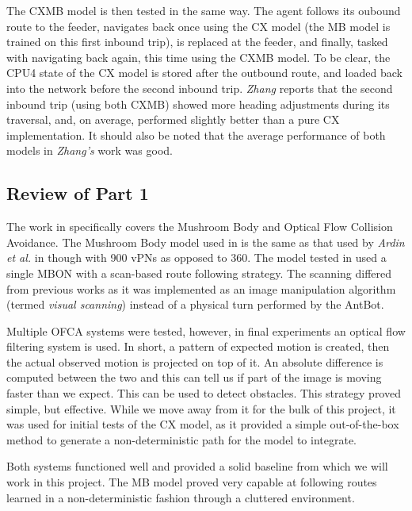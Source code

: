 \documentclass[a4paper,11pt,twoside,openright]{article}
\begin{document}
The CXMB model is then tested in the same way. The agent follows its oubound
route to the feeder, navigates back once using the CX model (the MB model is
trained on this first inbound trip), is replaced at the
feeder, and finally, tasked with navigating back again, this time using the CXMB
model. To be clear, the CPU4 state of the CX model is stored after the outbound
route, and loaded back into the network before the second inbound trip.
\textit{Zhang} reports that the second inbound trip (using both CXMB) showed
more heading adjustments during its traversal, and, on average, performed
slightly better than a pure CX implementation\cite{Zhang2017}. It should also
be noted that the average performance of both models in \textit{Zhang's} work
was good\cite{Zhang2017}.

\subsection{ Review of Part 1 }
The work in \cite{Mitchell2018} specifically covers the Mushroom Body
and Optical Flow Collision Avoidance. The Mushroom Body model used in
\cite{Mitchell2018} is the same as that used by \textit{Ardin et al.} in
\cite{Ardin2016} though with 900 vPNs as opposed to 360. The model tested
in \cite{Mitchell2018} used a single MBON with a scan-based route following
strategy. The scanning differed from previous works as it was implemented
as an image manipulation algorithm (termed \textit{visual scanning}) instead
of a physical turn performed by the AntBot.
\newline
\par

Multiple OFCA systems were tested, however, in final experiments an
optical flow filtering system is used. In short, a pattern of expected motion is
created, then the actual observed motion is projected on top of it. An absolute
difference is computed between the two and this can tell us if part of the image
is moving faster than we expect. This can be used to detect obstacles. This
strategy proved simple, but effective. While we move away from it for the
bulk of this project, it was used for initial tests of the CX model, as it
provided a simple out-of-the-box method to generate a non-deterministic
path for the model to integrate.
\newline
\par

Both systems functioned well and provided a solid baseline from which we will
work in this project. The MB model proved very capable at following routes
learned in a non-deterministic fashion through a cluttered environment.
\end{document}
